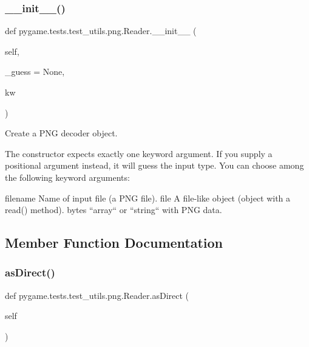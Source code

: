 \subsubsection{\texorpdfstring{\+\_\+\+\_\+init\+\_\+\+\_\+()}{\_\_init\_\_()}}
{\footnotesize\ttfamily def pygame.\+tests.\+test\+\_\+utils.\+png.\+Reader.\+\_\+\+\_\+init\+\_\+\+\_\+ (\begin{DoxyParamCaption}\item[{}]{self,  }\item[{}]{\+\_\+guess = {\ttfamily None},  }\item[{}]{kw }\end{DoxyParamCaption})}

\begin{DoxyVerb}Create a PNG decoder object.

The constructor expects exactly one keyword argument. If you
supply a positional argument instead, it will guess the input
type. You can choose among the following keyword arguments:

filename
  Name of input file (a PNG file).
file
  A file-like object (object with a read() method).
bytes
  ``array`` or ``string`` with PNG data.\end{DoxyVerb}
 

\subsection{Member Function Documentation}
\mbox{\label{classpygame_1_1tests_1_1test__utils_1_1png_1_1_reader_ae317f818b18d360226ab9fb30fb22fc4}} 
\subsubsection{\texorpdfstring{as\+Direct()}{asDirect()}}
{\footnotesize\ttfamily def pygame.\+tests.\+test\+\_\+utils.\+png.\+Reader.\+as\+Direct (\begin{DoxyParamCaption}\item[{}]{self }\end{DoxyParamCaption})}

